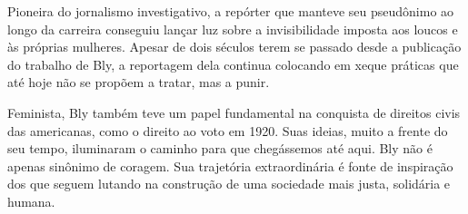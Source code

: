 \begin{multicols}{2}
Pioneira do jornalismo investigativo, a repórter
que manteve seu pseudônimo ao longo da
carreira conseguiu lançar luz sobre a
invisibilidade imposta aos loucos e às próprias mulheres.
Apesar de dois séculos terem se passado desde a
publicação do trabalho de Bly, a reportagem dela
continua colocando em xeque práticas que até
hoje não se propõem a tratar, mas a punir.

Feminista, Bly também teve um papel fundamental na conquista de direitos civis das americanas, como o direito ao voto em 1920. Suas
ideias, muito a frente do seu tempo, iluminaram
o caminho para que chegássemos até aqui. Bly
não é apenas sinônimo de coragem. Sua trajetória extraordinária é fonte de inspiração dos que seguem lutando na construção de uma sociedade
mais justa, solidária e humana.

\noindent{}\textcolor{gray}{\footnotesize{}}
\end{multicols}


\pagebreak
\pagestyle{imacat}

